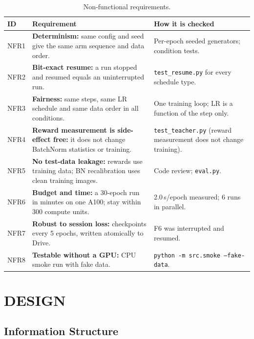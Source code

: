 \documentclass[a4paper,12pt]{report}
\begin{document}
\begin{table}[htbp]
\caption{Non-functional requirements.}
\label{tab:nfr}
\begin{center}
\footnotesize
\begin{tabular}{|l|P{6.6cm}|P{5.6cm}|} \hline
\textbf{ID} & \textbf{Requirement} & \textbf{How it is checked} \\ \hline
NFR1 & \textbf{Determinism:} same config and seed give the same arm sequence and data order. & Per-epoch seeded generators; condition tests. \\
NFR2 & \textbf{Bit-exact resume:} a run stopped and resumed equals an uninterrupted run. & \texttt{test\_resume.py} for every schedule type. \\
NFR3 & \textbf{Fairness:} same steps, same LR schedule and same data order in all conditions. & One training loop; LR is a function of the step only. \\
NFR4 & \textbf{Reward measurement is side-effect free:} it does not change BatchNorm statistics or training. & \texttt{test\_teacher.py} (reward measurement does not change training). \\
NFR5 & \textbf{No test-data leakage:} rewards use training data; BN recalibration uses clean training images. & Code review; \texttt{eval.py}. \\
NFR6 & \textbf{Budget and time:} a 30-epoch run in minutes on one A100; stay within 300 compute units. & 2.0\,s/epoch measured; 6 runs in parallel. \\
NFR7 & \textbf{Robust to session loss:} checkpoints every 5 epochs, written atomically to Drive. & F6 was interrupted and resumed. \\
NFR8 & \textbf{Testable without a GPU:} CPU smoke run with fake data. & \texttt{python -m src.smoke --fake-data}. \\ \hline
\end{tabular}
\end{center}
\end{table}

\chapter{DESIGN}

\section{Information Structure}
\end{document}
